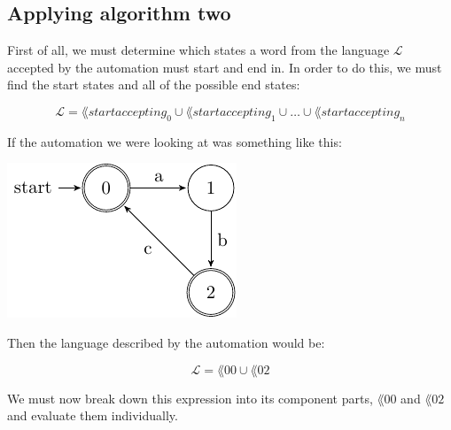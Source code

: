 \subsection{Applying algorithm two}

First of all, we must determine which states a word from the language
$\mathcal{L}$ accepted by the automation must start and end in. In order to do
this, we must find the start states and all of the possible end states:

\[
  \mathcal{L} = \lang{start}{accepting_0}{} \cup
    \lang{start}{accepting_1}{} \cup \dots \cup \lang{start}{accepting_n}{}
\]

If the automation we were looking at was something like this:


\begin{center}
  \includegraphics{automata/11.pdf}
\end{center}

Then the language described by the automation would be:

\[
  \mathcal{L} = \lang{0}{0}{} \cup \lang{0}{2}{}
\]

We must now break down this expression into its component parts, $\lang{0}{0}{}$
and $\lang{0}{2}{}$ and evaluate them individually.

